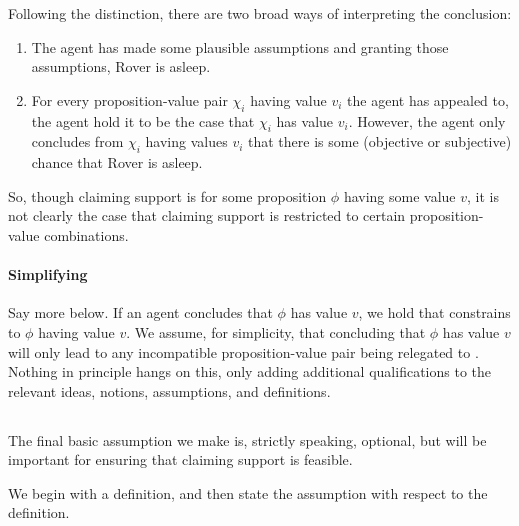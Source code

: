 \begin{note}[Suppositions]
  Following the distinction, there are two broad ways of interpreting the conclusion:
  \begin{enumerate}
  \item
    The agent has made some plausible assumptions and granting those assumptions, Rover is asleep.
  \item
    For every proposition-value pair \(\chi_{i}\) having value \(v_{i}\) the agent has appealed to, the agent hold it to be the case that \(\chi_{i}\) has value \(v_{i}\).
    However, the agent only concludes from \(\chi_{i}\) having values \(v_{i}\) that there is some (objective or subjective) chance that Rover is asleep.
  \end{enumerate}
  So, though claiming support is for some proposition \(\phi\) having some value \(v\), it is not clearly the case that claiming support is restricted to certain proposition-value combinations.
\end{note}

\paragraph{Simplifying}

\begin{assumption}
  \label{assu:simplifying:epPAlways}
  
\end{assumption}

\begin{note}
  Say more below.
  If an agent concludes that \(\phi\) has value \(v\), we hold that constrains  to \(\phi\) having value \(v\).
  We assume, for simplicity, that concluding that \(\phi\) has value \(v\) will only lead to any incompatible proposition-value pair being relegated to \epPAd{}.
  Nothing in principle hangs on this, only adding additional qualifications to the relevant ideas, notions, assumptions, and definitions.
\end{note}


\subsection{}
\label{sec:basic-assumptions:indication}

\begin{note}
  The final basic assumption we make is, strictly speaking, optional, but will be important for ensuring that claiming support is feasible.

  We begin with a definition, and then state the assumption with respect to the definition.
\end{note}

